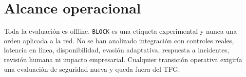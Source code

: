 
\section{Alcance operacional}

Toda la evaluación es offline. \texttt{BLOCK} es una etiqueta experimental y nunca una orden aplicada a la red. No se han analizado integración con controles reales, latencia en línea, disponibilidad, evasión adaptativa, respuesta a incidentes, revisión humana ni impacto empresarial. Cualquier transición operativa exigiría una evaluación de seguridad nueva y queda fuera del TFG.

